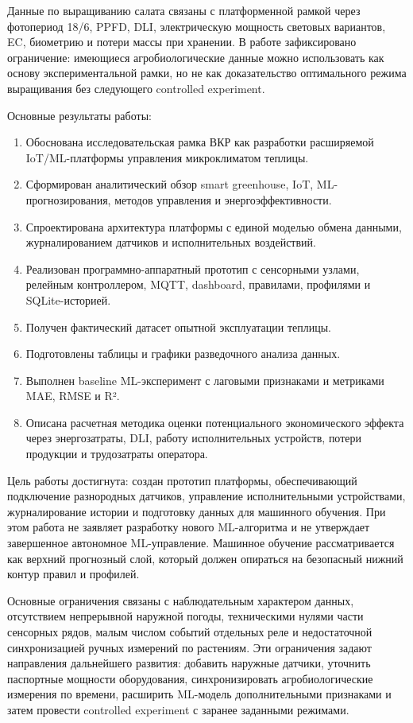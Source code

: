 \documentclass[a4paper,14pt]{extarticle}
\providecommand{\tightlist}{%
  \setlength{\itemsep}{0pt}\setlength{\parskip}{0pt}}
\begin{document}
Данные по выращиванию салата связаны с платформенной рамкой через
фотопериод 18/6, PPFD, DLI, электрическую мощность световых вариантов,
EC, биометрию и потери массы при хранении. В работе зафиксировано
ограничение: имеющиеся агробиологические данные можно использовать как
основу экспериментальной рамки, но не как доказательство оптимального
режима выращивания без следующего controlled experiment.

Основные результаты работы:

\begin{enumerate}
\def\labelenumi{\arabic{enumi})}
\tightlist
\item
  Обоснована исследовательская рамка ВКР как разработки расширяемой
  IoT/ML-платформы управления микроклиматом теплицы.
\item
  Сформирован аналитический обзор smart greenhouse, IoT,
  ML-прогнозирования, методов управления и энергоэффективности.
\item
  Спроектирована архитектура платформы с единой моделью обмена данными,
  журналированием датчиков и исполнительных воздействий.
\item
  Реализован программно-аппаратный прототип с сенсорными узлами,
  релейным контроллером, MQTT, dashboard, правилами, профилями и
  SQLite-историей.
\item
  Получен фактический датасет опытной эксплуатации теплицы.
\item
  Подготовлены таблицы и графики разведочного анализа данных.
\item
  Выполнен baseline ML-эксперимент с лаговыми признаками и метриками
  MAE, RMSE и R².
\item
  Описана расчетная методика оценки потенциального экономического
  эффекта через энергозатраты, DLI, работу исполнительных устройств,
  потери продукции и трудозатраты оператора.
\end{enumerate}

Цель работы достигнута: создан прототип платформы, обеспечивающий
подключение разнородных датчиков, управление исполнительными
устройствами, журналирование истории и подготовку данных для машинного
обучения. При этом работа не заявляет разработку нового ML-алгоритма и
не утверждает завершенное автономное ML-управление. Машинное обучение
рассматривается как верхний прогнозный слой, который должен опираться на
безопасный нижний контур правил и профилей.

Основные ограничения связаны с наблюдательным характером данных,
отсутствием непрерывной наружной погоды, техническими нулями части
сенсорных рядов, малым числом событий отдельных реле и недостаточной
синхронизацией ручных измерений по растениям. Эти ограничения задают
направления дальнейшего развития: добавить наружные датчики, уточнить
паспортные мощности оборудования, синхронизировать агробиологические
измерения по времени, расширить ML-модель дополнительными признаками и
затем провести controlled experiment с заранее заданными режимами.
\end{document}
